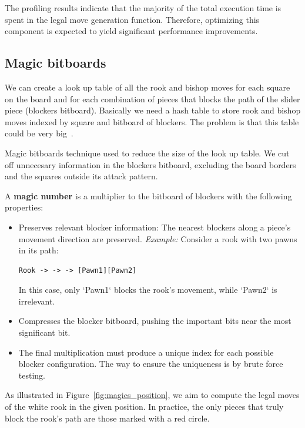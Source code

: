 \noindent The profiling results indicate that the majority of the total execution time is spent in the legal move generation function. Therefore, optimizing this component is expected to yield significant performance improvements.

\subsection{Magic bitboards}

We can create a look up table of all the rook and bishop moves for each square on the board and for each combination of pieces that blocks the path of the slider piece (blockers  bitboard). Basically we need a hash table to store rook and bishop moves indexed by square and bitboard of blockers. The problem is that this table could be very big~\cite{MagicBitboards}.

\vspace{1em}

\noindent Magic bitboards technique used to reduce the size of the look up table. We cut off unnecesary information in the blockers bitboard, excluding the board borders and the squares outside its attack pattern.

\vspace{1em}

\noindent A \textbf{magic number} is a multiplier to the bitboard of blockers with the following properties:

\begin{itemize}
  \item Preserves relevant blocker information: 
  The nearest blockers along a piece's movement direction are preserved. 
  \textit{Example:} Consider a rook with two pawns in its path:
  \begin{lstlisting}[breaklines=true]
    Rook -> -> -> [Pawn1][Pawn2]
  \end{lstlisting}
  In this case, only `Pawn1` blocks the rook's movement, while `Pawn2` is irrelevant.
  \item Compresses the blocker bitboard, pushing the important bits near the most significant bit.
  \item The final multiplication must produce a unique index for each possible blocker configuration. The way to ensure the uniqueness is by brute force testing.
\end{itemize}

\noindent As illustrated in Figure~\ref{fig:magics_position}, we aim to compute the legal moves of the white rook in the given position. In practice, the only pieces that truly block the rook's path are those marked with a red circle.

